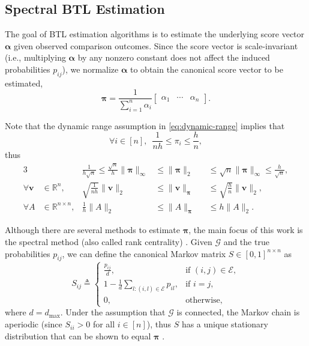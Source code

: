 \documentclass[sigconf,nonacm,pbalance]{acmart}
\begin{document}
\subsection{Spectral BTL Estimation}
The goal of BTL estimation algorithms is to estimate the underlying score vector $\bm{\alpha}$ given observed comparison outcomes. Since the score vector is scale-invariant (i.e., multiplying $\bm{\alpha}$ by any nonzero constant does not affect the induced probabilities $p_{ij}$), we normalize $\bm{\alpha}$ to obtain the canonical score vector to be estimated,
\begin{equation}
\bm{\pi} = \frac{1}{\sum_{i=1}^n \alpha_i} \begin{bmatrix}
    \alpha_1 & \cdots & \alpha_n
\end{bmatrix}.\label{eq:pi}
\end{equation}

Note that the dynamic range assumption in \cref{eq:dynamic-range} implies that
\begin{equation}
    \forall i \in [n],\enspace \frac{1}{nh} \leq \pi_i \leq \frac{h}{n},
\end{equation}
thus
\begin{alignat}{3}
    &&\frac{1}{h\sqrt{n}}\leq\frac{\sqrt{n}}{h} \|\bm{\pi}\|_\infty &\leq \|\bm{\pi}\|_2 &&\leq \sqrt{n} \|\bm{\pi}\|_\infty \leq \frac{h}{\sqrt{n}},\label{eq:pi-norm-relation}\\
\forall \bm{v} &\in \mathbb{R}^n,&\sqrt{\frac{1}{nh}} \|\bm{v}\|_2 &\leq \|\bm{v}\|_{\bm{\pi}} &&\leq \sqrt{\frac{h}{n}} \|\bm{v}\|_2,\\
    \forall A &\in \mathbb{R}^{n\times n},&\frac{1}{h} \|A\|_2 &\leq \|A\|_{\bm{\pi}} &&\leq h \|A\|_2.
\end{alignat}

Although there are several methods to estimate $\bm{\pi}$, the main focus of this work is the spectral method (also called rank centrality) \cite{NegahbanOhShah2017}.
Given $\mathcal{G}$ and the true probabilities $p_{ij}$, we can define the canonical Markov matrix $S \in [0, 1]^{n \times n}$ as
\begin{equation}
    S_{ij} \triangleq \begin{cases}
        \frac{p_{ij}}{d}, & \text{if } (i, j) \in \mathcal{E}, \\
        1 - \frac{1}{d} \sum_{l: (i, l) \in \mathcal{E}} p_{il}, & \text{if } i = j, \\
        0, & \text{otherwise,}
    \end{cases}\label{eq:S-definition}
\end{equation}
where $d=d_\text{max}$. Under the assumption that $\mathcal{G}$ is connected, the Markov chain is aperiodic (since $S_{ii} > 0$ for all $i\in[n]$), thus $S$ has a unique stationary distribution that can be shown to equal $\bm{\pi}$ \cite{LevinPeresWilmer2009}.
\end{document}
